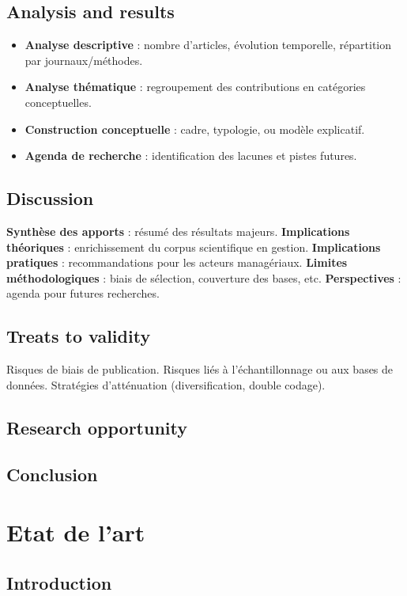 \documentclass[a4paper,12pt]{article}
\begin{document}
\subsection{Analysis and results}
\label{sec:orgfda1f08}
\begin{itemize}
\item \textbf{\textbf{Analyse descriptive}} : nombre d’articles, évolution temporelle, répartition par journaux/méthodes.
\item \textbf{\textbf{Analyse thématique}} : regroupement des contributions en catégories conceptuelles.
\item \textbf{\textbf{Construction conceptuelle}} : cadre, typologie, ou modèle explicatif.
\item \textbf{\textbf{Agenda de recherche}} : identification des lacunes et pistes futures.
\end{itemize}
\subsection{Discussion}
\label{sec:org189666f}
\textbf{\textbf{Synthèse des apports}} : résumé des résultats majeurs.
\textbf{\textbf{Implications théoriques}} : enrichissement du corpus scientifique en gestion.
\textbf{\textbf{Implications pratiques}} : recommandations pour les acteurs managériaux.
\textbf{\textbf{Limites méthodologiques}} : biais de sélection, couverture des bases, etc.
\textbf{\textbf{Perspectives}} : agenda pour futures recherches.
\subsection{Treats to validity}
\label{sec:org31c9529}
Risques de biais de publication.
Risques liés à l’échantillonnage ou aux bases de données.
Stratégies d’atténuation (diversification, double codage).
\subsection{Research opportunity}
\label{sec:orge6c686f}

\subsection{Conclusion}
\label{sec:org90e3c11}
\clearpage
\section{Etat de l'art}
\label{sec:org6d7ded3}
\subsection{Introduction}
\label{sec:org17f0559}
\end{document}
